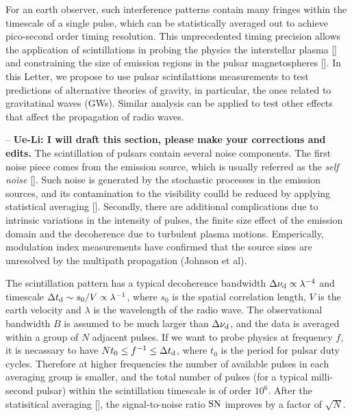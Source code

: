 \documentclass[prl,aps,floatfix,superscriptaddress,twocolumn]{revtex4}
\begin{document}
 For an earth observer, such
interference patterns contain many fringes within the timescale of a
single pulse, which can be statistically averaged out to achieve
pico-second order timing resolution.  This unprecedented timing
precision allows the application of scintillations in probing the
physics the interstellar plasma [] and
constraining the size of emission regions in the pulsar magnetospheres
[]. In this Letter, we propose to use pulsar scintilattions
measurements to test predictions of alternative theories of gravity,
in particular, the ones related to gravitatinal waves (GWs). Similar
analysis can be applied to test other effects that affect the
propagation of radio waves.

 -- {\bf Ue-Li: I will draft this
  section, please make your corrections and edits.} The scintillation
of pulsars contain several noise components. The first noise piece
comes from the emission source, which is usually referred as the {\it
  self noise} []. Such noise is generated by the stochastic processes
in the emission sources, and its contamination to the visibility
coulld be reduced by applying statistical averaging []. Secondly,
there are additional complications due to intrinsic variations in the
intensity of pulses, the finite size effect of the emission domain and
the decoherence due to turbulent plasma motions.  Emperically,
modulation index measurements have confirmed that the source sizes are
unresolved by the multipath propagation (Johnson et al).

The scintillation pattern has a typical decoherence bandwidth $\Delta \nu_{\rm d} \propto \lambda^{-4}$ and  timescale $\Delta t_{\rm d} \sim s_0/V \propto \lambda^{-1}$, where $s_0$ is the spatial correlation length, $V$ is the earth velocity and $\lambda$ is the wavelength of the radio wave. The observational bandwidth $B$ is assumed to be much larger than $\Delta \nu_{\rm d}$, and the data is averaged within a group of $N$ adjacent pulses. If we want to probe physics at frequency $f$, it is necassary to have $N t_0 \le f^{-1} \le \Delta t_{\rm d}$, where $t_0$ is the period for pulsar duty cycles.   Therefore at higher frequencies the number of available pulses in each averaging group is smaller, and the total number of pulses (for a typical milli-second pulsar) within the scintillation timescale is of order $10^6$. After the statisitical averaging [], the signal-to-noise ratio ${\rm SN}$ improves by a factor of $\sqrt{N}$.
\end{document}
